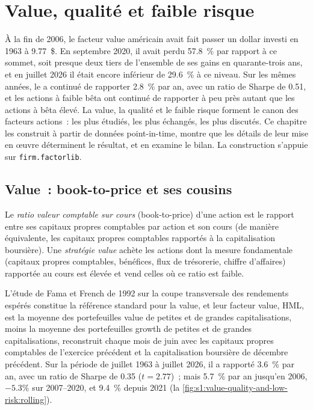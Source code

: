 \chapter{Value, qualité et faible risque}\label{ch:s1:value-quality-and-low-risk}

À la fin de 2006, le facteur value américain avait fait passer un dollar investi en 1963 à 9.77~\$. En septembre 2020, il avait perdu 57.8~\% par rapport à ce sommet, soit presque deux
tiers de l'ensemble de ses gains en quarante-trois ans, et en juillet 2026 il était encore inférieur de 29.6~\% à ce niveau. Sur les mêmes années, le  a continué de rapporter 2.8~\% par
an, avec un ratio de Sharpe de 0.51, et les actions à faible bêta ont continué de rapporter à peu près autant que les actions à bêta élevé. La value, la qualité et le faible risque forment le canon des
facteurs actions~: les plus étudiés, les plus échangés, les plus discutés. Ce chapitre les construit à partir de données point-in-time, montre que les détails de leur mise en œuvre
déterminent le résultat, et en examine le bilan. La construction s'appuie sur \texttt{firm.factorlib}.

\section{Value~: book-to-price et ses cousins}

\begin{definition}\label{def:s1:value-quality-and-low-risk:value}
Le \emph{ratio valeur comptable sur cours} (book-to-price) d'une action est le rapport entre ses capitaux propres comptables par action et son cours (de manière équivalente, les capitaux propres comptables rapportés à la
capitalisation boursière). Une \emph{stratégie value} achète les actions dont la mesure fondamentale (capitaux propres comptables, bénéfices, flux de trésorerie, chiffre d'affaires) rapportée au cours est élevée
et vend celles où ce ratio est faible.
\end{definition}

L'étude de Fama et French de 1992 sur la coupe transversale des rendements espérés constitue la référence standard pour la value, et leur facteur value, HML, est la moyenne des portefeuilles value de petites et de grandes capitalisations, moins la moyenne des portefeuilles growth de petites et de grandes capitalisations, reconstruit chaque mois de juin avec
les capitaux propres comptables de l'exercice précédent et la capitalisation boursière de décembre précédent. Sur la période de juillet 1963 à juillet 2026, il a rapporté 3.6~\% par an, avec un ratio de Sharpe
de 0.35 ($t = 2.77$)~; mais 5.7~\% par an jusqu'en 2006, $-5.3\%$ sur 2007--2020, et 9.4~\% depuis 2021 (la \cref{fig:s1:value-quality-and-low-risk:rolling}).

